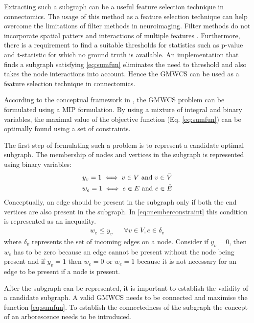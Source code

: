 \documentclass[msthesis.tex]{subfiles}
\begin{document}
Extracting such a subgraph can be a useful feature selection technique in connectomics. The usage of this method as a feature selection technique can help overcome the limitations of filter methods in neuroimaging. Filter methods do not incorporate spatial patters and interactions of multiple features \citep{behrens2003non}. Furthermore, there is a requirement to find a suitable thresholds for statistics such as p-value and t-statistic for which no ground truth is available. An implementation that finds a subgraph satisfying \cref{eq:sumfun} eliminates the need to threshold and also takes the node interactions into account. Hence the \gls{GMWCS} can be used as a feature selection technique in connectomics.

According to the conceptual framework in \cite{DBLP:journals/corr/LobodaAS16}, the \gls{GMWCS} problem can be formulated using a \gls{MIP} formulation. By using a mixture of integral and binary variables, the maximal value of the objective function (Eq. \ref{eq:sumfun}) can be optimally found using a set of constraints.

The first step of formulating such a problem is to represent a candidate optimal subgraph. The membership of nodes and vertices in the subgraph is represented using binary variables:
\begin{align}
    \label{eq:y_v}
    y_v = 1  \iff v \in V  \textrm{ and } v \in \Tilde{V} \\
    \label{eq:w_e}
    w_e =1  \iff e \in E  \textrm{  and }  e \in \Tilde{E}
\end{align}
Conceptually, an edge should be present in the subgraph only if both the end vertices are also present in the subgraph. In \cref{eq:memberconstraint} this condition is represented as an inequality.
\begin{align}
    \label{eq:memberconstraint}
    w_e \leq y_v && \forall v \in V, e \in \delta_{v}
\end{align}
where $\delta_{v}$ represents the set of incoming edges on a node. Consider if $y_v = 0$, then $w_e$ has to be zero because an edge cannot be present without the node being present and if $y_v = 1$ then $w_e = 0$ or $w_e = 1$ because it is not necessary for an edge to be present if a node is present.

After the subgraph can be represented, it is important to establish the validity of a candidate subgraph. A valid \gls{GMWCS} needs to be connected and maximise the function \cref{eq:sumfun}. To establish the connectedness of the subgraph the concept of an arborescence needs to be introduced.
\end{document}
